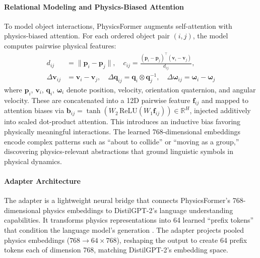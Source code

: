 \documentclass[conference]{IEEEtran}
\theoremstyle{plain}
\theoremstyle{definition}
\theoremstyle{remark}
\begin{document}
\paragraph{Relational Modeling and Physics-Biased Attention}
To model object interactions, PhysicsFormer augments self-attention with physics-biased attention. For each ordered object pair $(i,j)$, the model computes pairwise physical features:
\begin{align}
d_{ij} &= \|\mathbf{p}_i - \mathbf{p}_j\|, \quad
c_{ij} = \frac{(\mathbf{p}_i - \mathbf{p}_j)^\top (\mathbf{v}_i - \mathbf{v}_j)}{d_{ij}}, \nonumber \\
\Delta \mathbf{v}_{ij} &= \mathbf{v}_i - \mathbf{v}_j, \quad
\Delta \mathbf{q}_{ij} = \mathbf{q}_i \otimes \mathbf{q}_j^{-1}, \quad
\Delta \boldsymbol{\omega}_{ij} = \boldsymbol{\omega}_i - \boldsymbol{\omega}_j \nonumber
\end{align}
where $\mathbf{p}_i$, $\mathbf{v}_i$, $\mathbf{q}_i$, $\boldsymbol{\omega}_i$ denote position, velocity, orientation quaternion, and angular velocity. These are concatenated into a 12D pairwise feature $\mathbf{f}_{ij}$ and mapped to attention biases via $\mathbf{b}_{ij} = \tanh(W_2 \, \text{ReLU}(W_1 \mathbf{f}_{ij})) \in \mathbb{R}^{H}$, injected additively into scaled dot-product attention. This introduces an inductive bias favoring physically meaningful interactions. The learned 768-dimensional embeddings encode complex patterns such as ``about to collide'' or ``moving as a group,'' discovering physics-relevant abstractions that ground linguistic symbols in physical dynamics.

\paragraph{Adapter Architecture}
The adapter is a lightweight neural bridge that connects PhysicsFormer's 768-dimensional physics embeddings to DistilGPT-2's language understanding capabilities. It transforms physics representations into 64 learned ``prefix tokens'' that condition the language model's generation \cite{li2021prefix}. The adapter projects pooled physics embeddings ($768 \to 64 \times 768$), reshaping the output to create 64 prefix tokens each of dimension 768, matching DistilGPT-2's embedding space.
\end{document}
